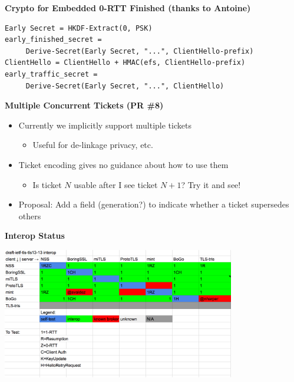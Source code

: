 \documentclass[helvetica]{seminar}
\newcommand{\heading}[1]{%
  \begin{center} 
    \large\bf 
    #1 
  \end{center} 
  \vspace{.4 in}}
\begin{document}
\begin{slide}
\heading{Crypto for Embedded 0-RTT Finished (thanks to Antoine)}

\begin{verbatim}
Early Secret = HKDF-Extract(0, PSK)
early_finished_secret =
     Derive-Secret(Early Secret, "...", ClientHello-prefix)
ClientHello = ClientHello + HMAC(efs, ClientHello-prefix)
early_traffic_secret =
     Derive-Secret(Early Secret, "...", ClientHello)
\end{verbatim}
\end{slide}


\begin{slide}
\heading{Multiple Concurrent Tickets (PR \#8)}

\begin{itemize}
\item Currently we implicitly support multiple tickets
  \begin{itemize}
  \item Useful for de-linkage privacy, etc.
  \end{itemize}

\item Ticket encoding gives no guidance about how to use them
  \begin{itemize}
  \item Is ticket $N$ usable after I see ticket $N+1$? Try it and see!
  \end{itemize}

\item Proposal: Add a field (generation?) to indicate whether a ticket supersedes others
\end{itemize}

\end{slide}


\begin{slide}
\heading{Interop Status}

\includegraphics[width=4in]{interop-matrix}

\end{slide}
\end{document}
